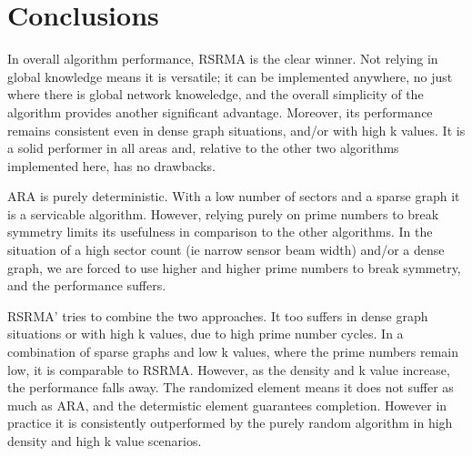 \section{Conclusions}

In overall algorithm performance, RSRMA is the clear winner. Not relying in global knowledge means it is versatile; it can be implemented anywhere, no just where there is global network knoweledge, and the overall simplicity of the algorithm provides another significant advantage. Moreover, its performance remains consistent even in dense graph situations, and/or with high k values. It is a solid performer in all areas and, relative to the other two algorithms implemented here, has no drawbacks.

ARA is purely deterministic. With a low number of sectors and a sparse graph it is a servicable algorithm. However, relying purely on prime numbers to break symmetry limits its usefulness in comparison to the other algorithms. In the situation of a high sector count (ie narrow sensor beam width) and/or a dense graph, we are forced to use higher and higher prime numbers to break symmetry, and the performance suffers. 

RSRMA' tries to combine the two approaches. It too suffers in dense graph situations or with high k values, due to high prime number cycles. In a combination of sparse graphs and low k values, where the prime numbers remain low, it is comparable to RSRMA. However, as the density and k value increase, the performance falls away. The randomized element means it does not suffer as much as ARA, and the determistic element guarantees completion. However in practice it is consistently outperformed by the purely random algorithm in high density and high k value scenarios.


